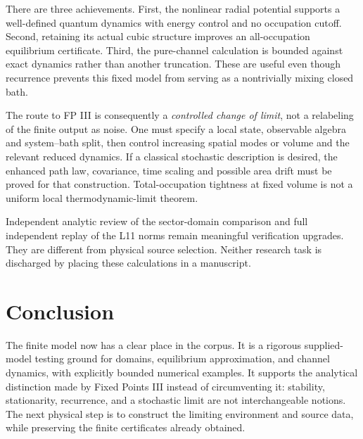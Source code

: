 \documentclass[11pt]{article}
\begin{document}
There are three achievements. First, the nonlinear radial potential
supports a well-defined quantum dynamics with energy control and no
occupation cutoff. Second, retaining its actual cubic structure improves
an all-occupation equilibrium certificate. Third, the pure-channel
calculation is bounded against exact dynamics rather than another
truncation. These are useful even though recurrence prevents this fixed
model from serving as a nontrivially mixing closed bath.

The route to FP III is consequently a \emph{controlled change of limit},
not a relabeling of the finite output as noise. One must specify a local
state, observable algebra and system--bath split, then control increasing
spatial modes or volume and the relevant reduced dynamics. If a classical
stochastic description is desired, the enhanced path law, covariance,
time scaling and possible area drift must be proved for that construction.
Total-occupation tightness at fixed volume is not a uniform local
thermodynamic-limit theorem.

Independent analytic review of the sector-domain comparison and full
independent replay of the L11 norms remain meaningful verification
upgrades. They are different from physical source selection. Neither
research task is discharged by placing these calculations in a manuscript.

\section{Conclusion}
The finite model now has a clear place in the corpus. It is a rigorous
supplied-model testing ground for domains, equilibrium approximation,
and channel dynamics, with explicitly bounded numerical examples.
It supports the analytical distinction made by Fixed Points III instead
of circumventing it: stability, stationarity, recurrence, and a
stochastic limit are not interchangeable notions. The next physical step
is to construct the limiting environment and source data, while preserving
the finite certificates already obtained.

\end{document}
